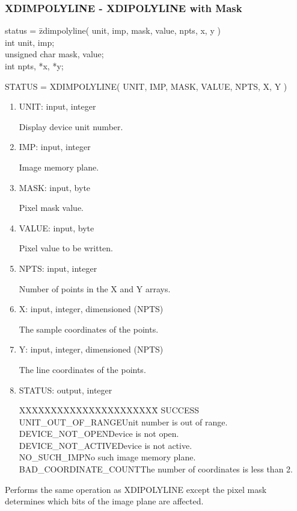 \subsubsection{XDIMPOLYLINE - XDIPOLYLINE with Mask}
\begin{tabbing}
status = \=zdimpolyline( unit, imp, mask, value, npts, x, y )\\
\>int  unit, imp;\\
\>unsigned char  mask, value;\\
\>int  npts, *x, *y;\\
\end{tabbing}
STATUS = XDIMPOLYLINE( UNIT, IMP, MASK, VALUE, NPTS, X, Y )
\begin{enumerate}
\item UNIT:  input, integer

Display device unit number.
\item IMP:  input, integer

Image memory plane.
\item MASK:  input, byte

Pixel mask value.
\item VALUE:  input, byte

Pixel value to be written.
\item NPTS:  input, integer

Number of points in the X and Y arrays.
\item X:  input, integer, dimensioned (NPTS)

The sample coordinates of the points.
\item Y:  input, integer, dimensioned (NPTS)

The line coordinates of the points.
\item STATUS:  output, integer
\begin{tabbing}
XXXXXXXXXXXXXXXXXXXXXX\=\kill
SUCCESS\\
UNIT\_OUT\_OF\_RANGE\>Unit number is out of range.\\
DEVICE\_NOT\_OPEN\>Device is not open.\\
DEVICE\_NOT\_ACTIVE\>Device is not active.\\
NO\_SUCH\_IMP\>No such image memory plane.\\
BAD\_COORDINATE\_COUNT\>The number of coordinates is less than 2.\\
\end{tabbing}
\end{enumerate}
Performs the same operation as XDIPOLYLINE except the pixel mask
determines which bits of the image plane are affected.
\newpage

